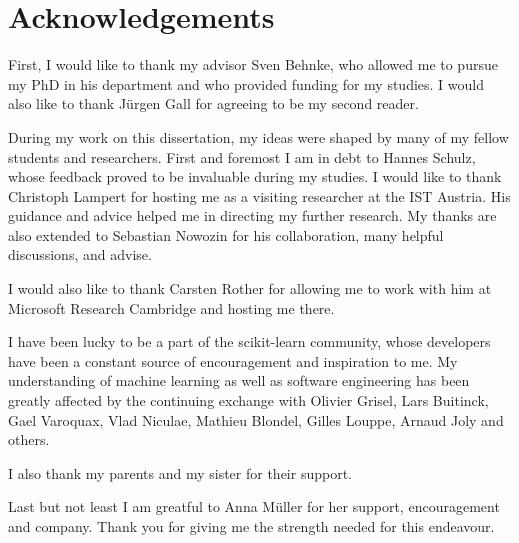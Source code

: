 \documentclass[12pt,toc=bibnumbered, a4paper,twoside,DIV=11,BCOR=.5cm]{scrbook}
\begin{document}
\chapter*{Acknowledgements}
First, I would like to thank my advisor Sven Behnke, who allowed me
to pursue my PhD in his department and who provided funding for my studies.
I would also like to thank J\"urgen Gall for agreeing to be my second reader.

During my work on this dissertation, my ideas were shaped by many of my fellow
students and researchers. First and foremost I am in debt to Hannes Schulz,
whose feedback proved to be invaluable during my studies.
I would like to thank Christoph Lampert for hosting me as a visiting researcher
at the IST Austria. His guidance and advice helped me in directing my further
research. My thanks are also extended to Sebastian Nowozin for his collaboration,
many helpful discussions, and advise.

I would also like to thank Carsten Rother for allowing me to work with him
at Microsoft Research Cambridge and hosting me there.

I have been lucky to be a part of the scikit-learn community, whose developers
have been a constant source of encouragement and inspiration to me. My
understanding of machine learning as well as software engineering has been
greatly affected by the continuing exchange with Olivier Grisel, Lars Buitinck,
Gael Varoquax, Vlad Niculae, Mathieu Blondel, Gilles Louppe, Arnaud Joly and
others.

I also thank my parents and my sister for their support.

Last but not least I am greatful to Anna M\"uller for her support,
encouragement and company. Thank you for giving me the strength needed for this
endeavour.
\cleardoublepage
{}


%












\end{document}
